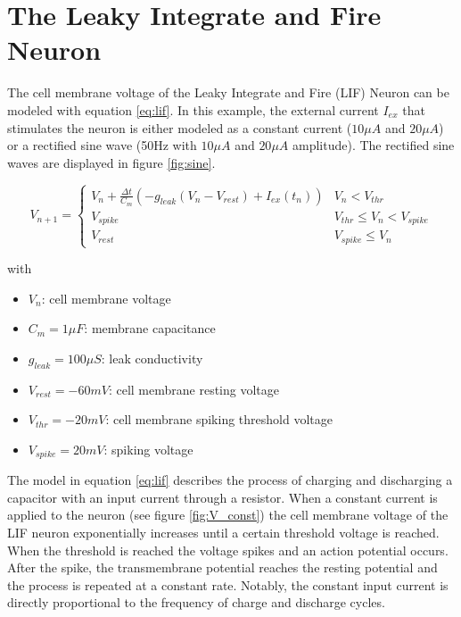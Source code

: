 \documentclass{scrartcl}
\begin{document}
\newpage
\section{The Leaky Integrate and Fire Neuron}

The cell membrane voltage of the Leaky Integrate and Fire (LIF) Neuron can be modeled with equation \ref{eq:lif}. In this example, the external current $I_{ex}$ that stimulates the neuron is either modeled as a constant current ($10\mu A$ and $20\mu A$) or a rectified sine wave (50Hz with $10\mu A$ and $20\mu A$ amplitude). The rectified sine waves are displayed in figure \ref{fig:sine}. 

\begin{equation}
\label{eq:lif}
V_{n+1}=\left\{\begin{array}{ll}{V_{n}+\frac{\Delta t}{C_{m}}\left(-g_{l e a k}\left(V_{n}-V_{r e s t}\right)+I_{ex}\left(t_{n}\right)\right)} & {V_{n}<V_{t h r}} \\ {V_{s p i k e}} & {V_{t h r} \leq V_{n}<V_{s p i k e}} \\ {V_{r e s t}} & {V_{s p i k e} \leq V_{n}}\end{array}\right.
\end{equation}

with 
\vspace{0.2cm}
\begin{itemize}
	\item $V_n$: cell membrane voltage
	\item $C_m = 1\mu F$: membrane capacitance
	\item $g_{leak} = 100\mu S$: leak conductivity
	\item $V_{rest} = -60mV$: cell membrane resting voltage
	\item $V_{thr} = -20mV$: cell membrane spiking threshold voltage
	\item $V_{spike} = 20mV$: spiking voltage
\end{itemize}


\vspace{0.7cm}
The model in equation \ref{eq:lif} describes the process of charging and discharging a capacitor with an input current through a resistor. When a constant current is applied to the neuron (see figure \ref{fig:V_const}) the cell membrane voltage of the LIF neuron exponentially increases until a certain threshold voltage is reached. When the threshold is reached the voltage spikes and an action potential occurs. After the spike, the transmembrane potential reaches the resting potential and the process is repeated at a constant rate. Notably, the constant input current is directly proportional to the frequency of charge and discharge cycles.
\end{document}
